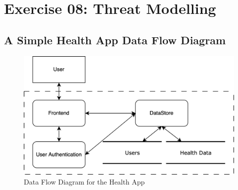 \section{Exercise 08: Threat Modelling}
\subsection{A Simple Health App Data Flow Diagram}
\begin{figure}[H]
  \caption{Data Flow Diagram for the Health App}
  \vspace*{1em}
  \begin{center}
    \includegraphics[width=\textwidth]{Diagrams/threat-modelling-1.png}
  \end{center}
\end{figure}
